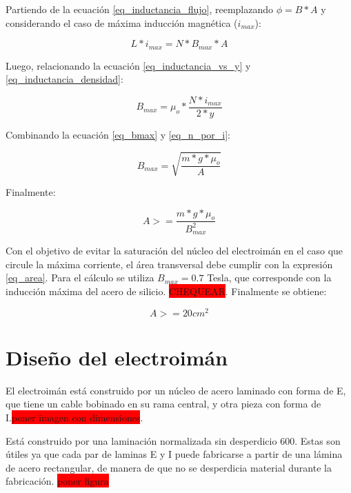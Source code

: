 \noindent Partiendo de la ecuación \ref{eq_inductancia_flujo}, reemplazando $\phi=B*A$ y considerando el caso de máxima inducción magnética ($i_{max}$):

\begin{equation}\label{eq_inductancia_densidad}
	L*i_{max}=N*B_{max}*A
\end{equation}

\noindent Luego, relacionando la ecuación \ref{eq_inductancia_vs_y} y \ref{eq_inductancia_densidad}:

\begin{equation} \label{eq_bmax}
	B_{max}=\mu_{o}*\frac{N*i_{max}}{2*y}
\end{equation}

\noindent Combinando la ecuación \ref{eq_bmax} y \ref{eq_n_por_i}:

\begin{equation}
	B_{max}=\sqrt{\frac{m*g*\mu_{o}}{A}}
\end{equation}

\noindent Finalmente:

\begin{equation} \label{eq_area}
	A>=\frac{m*g*\mu_{o}}{B_{max}^{2}}
\end{equation}

\noindent Con el objetivo de evitar la saturación del núcleo del electroimán en el caso que circule la máxima corriente, el área transversal debe cumplir con la expresión \ref{eq_area}. Para el cálculo se utiliza $B_{max}=0.7$ Tesla, que corresponde con la inducción máxima del acero de silicio. \colorbox{red}{CHEQUEAR}. Finalmente se obtiene:

\begin{equation}
	A>=20 cm^{2}
\end{equation}


\section{Diseño del electroimán}

\noindent El electroimán está construido por un núcleo de acero laminado con forma de E, que tiene un cable bobinado en su rama central, y otra pieza con forma de I.\colorbox{red}{poner imagen con dimensiones}. 
% 

Está construido por una laminación normalizada sin desperdicio 600. Estas son útiles ya que cada par de laminas E y I puede fabricarse a partir de una lámina de acero rectangular, de manera de que no se desperdicia material durante la fabricación. \colorbox{red}{poner figura}

